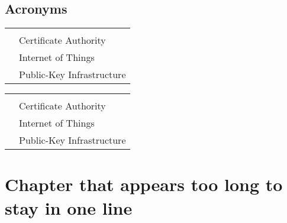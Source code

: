 \documentclass[12pt,desert]{cool-white-paper}
\begin{document}
\authorBios


\section*{Acronyms}
\begin{minipage}[t]{0.44\textwidth}
  \begin{center}
    \begin{longtable}{ T F }
     \\ \endfoot
    \endlastfoot
      
             & Certificate Authority \\
            & Internet of Things \\
            & Public-Key Infrastructure \\
      
    \end{longtable}
  \end{center}
\end{minipage}%
\begin{minipage}{0.08\textwidth}\strut \end{minipage}%
\begin{minipage}[t]{0.44\textwidth}
  \begin{center}
    \begin{longtable}{ T F }
     \\ \endfoot
    \endlastfoot
    
             & Certificate Authority \\
            & Internet of Things \\
            & Public-Key Infrastructure \\
      
    \end{longtable}
  \end{center}
\end{minipage}%

\tableofcontents

\chapter[Chapter that appears too long to stay in one line]{\nohyphens{Chapter that appears too long to stay \tnl in one line}}
\end{document}
